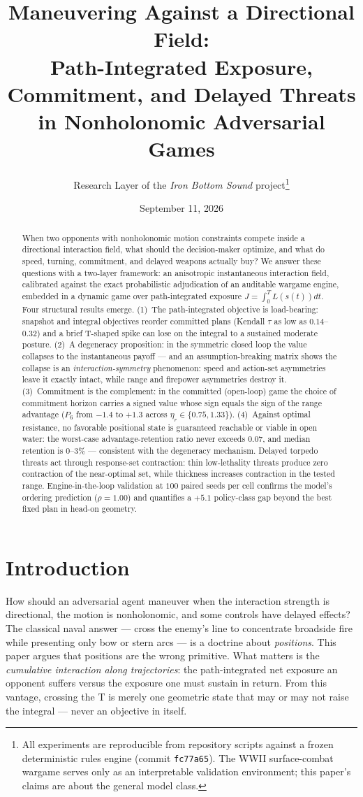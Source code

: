 \documentclass[12pt,a4paper]{article}
\title{Maneuvering Against a Directional Field:\\
Path-Integrated Exposure, Commitment, and Delayed Threats\\
in Nonholonomic Adversarial Games}
\author{Research Layer of the \emph{Iron Bottom Sound} project\thanks{All
experiments are reproducible from repository scripts against a frozen
deterministic rules engine (commit \texttt{fc77a65}).  The WWII surface-combat
wargame serves only as an interpretable validation environment; this paper's
claims are about the general model class.}}
\date{September 11, 2026}
\newcommand{\etar}{\eta_r}
\begin{document}
\maketitle

\begin{abstract}
When two opponents with nonholonomic motion constraints compete inside a
directional interaction field, what should the decision-maker optimize, and
what do speed, turning, commitment, and delayed weapons actually buy?  We
answer these questions with a two-layer framework: an anisotropic
instantaneous interaction field, calibrated against the exact probabilistic
adjudication of an auditable wargame engine, embedded in a dynamic game over
path-integrated exposure $J=\int_0^T L(s(t))dt$.  Four structural results
emerge.  (1)~The path-integrated objective is load-bearing: snapshot and
integral objectives reorder committed plans (Kendall $\tau$ as low as
$0.14$--$0.32$) and a brief T-shaped spike can lose on the integral to a
sustained moderate posture.  (2)~A degeneracy proposition: in the symmetric
closed loop the value collapses to the instantaneous payoff --- and an
assumption-breaking matrix shows the collapse is an
\emph{interaction-symmetry} phenomenon: speed and action-set asymmetries
leave it exactly intact, while range and firepower asymmetries destroy it.
(3)~Commitment is the complement: in the committed (open-loop) game the
choice of commitment horizon carries a signed value whose sign equals the
sign of the range advantage ($P_6$ from $-1.4$ to $+1.3$ across
$\etar\in\{0.75,1.33\}$).  (4)~Against optimal resistance, no favorable
positional state is guaranteed reachable or viable in open water: the
worst-case advantage-retention ratio never exceeds $0.07$, and median
retention is $0$--$3\%$ --- consistent with the degeneracy mechanism.
Delayed torpedo threats act through response-set contraction: thin
low-lethality threats produce zero contraction of the near-optimal set,
while thickness increases contraction in the tested range.  Engine-in-the-loop
validation at $100$ paired seeds per cell confirms the model's ordering
prediction ($\rho=1.00$) and quantifies a $+5.1$ policy-class gap
beyond the best fixed plan in head-on geometry.
\end{abstract}

\section{Introduction}\label{sec:intro}

How should an adversarial agent maneuver when the interaction strength is
directional, the motion is nonholonomic, and some controls have delayed
effects?  The classical naval answer --- cross the enemy's line to concentrate
broadside fire while presenting only bow or stern arcs --- is a doctrine about
\emph{positions}.  This paper argues that positions are the wrong primitive.
What matters is the \emph{cumulative interaction along trajectories}: the
path-integrated net exposure an opponent suffers versus the exposure one must
sustain in return.  From this vantage, crossing the T is merely one geometric
state that may or may not raise the integral --- never an objective in itself.
\end{document}
